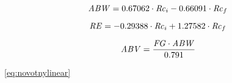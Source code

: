 \documentclass[a4paper,parskip=half]{scrartcl}
\begin{document}
\begin{equation} 
\mathit{ABW} = 0.67062 \cdot \mathit{Rc}_i - 0.66091 \cdot \mathit{Rc}_f
\end{equation}

\begin{equation} 
\mathit{RE} = -0.29388 \cdot \mathit{Rc}_i + 1.27582 \cdot \mathit{Rc}_f
\end{equation} 

\begin{equation} 
\mathit{ABV} = \frac{\mathit{FG} \cdot \mathit{ABW}}{0.791}
\end{equation} 


\autoref{eq:novotnylinear}




\printbibliography[title=Quellen]
\end{document}
